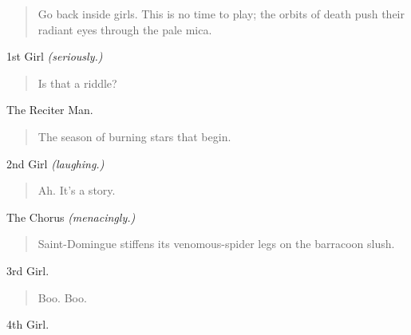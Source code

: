\documentclass[letterpaper,article,12pt,oneside,notitlepage]{memoir}
\begin{document}
\begin{verse}
\indent Go back inside girls. This is no time to play; the orbits of death push their radiant eyes through the pale mica. \\
\end{verse}

\begin{center}1st Girl \textit{(seriously.)}\end{center}

\begin{verse}
\hspace{1cm} Is that a riddle? \\
\end{verse}

\begin{center}The Reciter Man.\end{center}

\begin{verse}
\hspace{1cm} The season of burning stars that begin. \\
\end{verse}

\begin{center}2nd Girl \textit{(laughing.)}\end{center}

\begin{verse}
\hspace{1cm} Ah. It's a story. \\
\end{verse}

\begin{center}The Chorus \textit{(menacingly.)}\end{center}

\begin{verse}
\indent Saint-Domingue stiffens its venomous-spider legs on the barracoon slush. \\
\end{verse}

\begin{center}3rd Girl.\end{center}

\begin{verse}
\hspace{1cm} Boo. Boo. \\
\end{verse}

\begin{center}4th Girl.\end{center}
\end{document}

